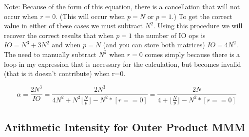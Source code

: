 \documentclass[a4 paper]{article}
\begin{document}
{Note: Because of the form of this equation, there is a cancellation that will not occur when $r=0$. (This will occur when $p=N$ or $p=1$.) To get the correct value in either of these cases we must subtract $N^2$. Using this procedure we will recover the correct results that when $p=1$ the number of IO ops is $IO=N^3+3N^2$ and when $p=N$ (and you can store both matrices) $IO=4N^2$. The need to manually subtract $N^2$ when $r=0$ comes simply because there is a loop in my expression that is necessary for the calculation, but becomes invalid (that is it doesn't contribute) when r=0.  

$$ \alpha = \frac{2N^3}{IO} = \frac{2N^3}{4N^2 + N^2\bigg\lfloor\frac{N}{p}\bigg\rfloor - N^2*[r==0]} = \frac{2N}{4+\bigg\lfloor\frac{N}{p}\bigg\rfloor - N^2*[r==0]}$$

}

\subsection*{Arithmetic Intensity for Outer Product MMM}
\end{document}

